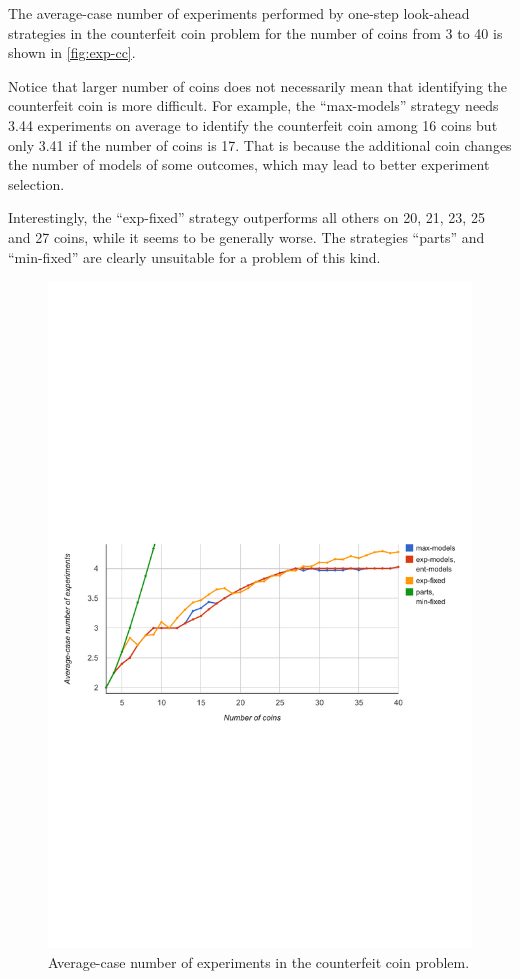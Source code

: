 The average-case number of experiments performed by one-step look-ahead
  strategies in the counterfeit coin problem
  for the number of coins from 3 to 40 is shown in \autoref{fig:exp-cc}.

Notice that larger number of coins does not necessarily mean that
  identifying the counterfeit coin is more difficult.
For example, the ``max-models'' strategy needs
  3.44 experiments on average to identify the counterfeit coin
  among 16 coins but only 3.41 if the number of coins is 17.
That is because the additional coin changes
  the number of models of some outcomes,
  which may lead to better experiment selection.

Interestingly, the ``exp-fixed'' strategy outperforms all others
  on 20, 21, 23, 25 and 27 coins, while it seems to be
  generally worse.
The strategies ``parts'' and ``min-fixed'' are clearly unsuitable for
  a problem of this kind.

\begin{figure}[ht]
\begin{center}
\includegraphics[width=\textwidth]{pictures/graph-cc.pdf}
\caption{Average-case number of experiments in the counterfeit coin problem.}
\label{fig:exp-cc}
\end{center}
\end{figure}


